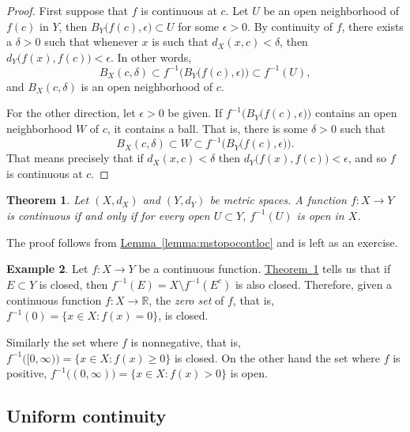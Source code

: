 \documentclass[12pt,openany]{book}
\newcommand{\R}{{\mathbb{R}}}
\newcommand{\myindex}[1]{#1\index{#1}}
\theoremstyle{plain}
\newtheorem{thm}{Theorem}[section]
\theoremstyle{remark}
\theoremstyle{definition}
\theoremstyle{exercise}
\theoremstyle{example}
\newtheorem{example}[thm]{Example}
\newcommand{\thmref}[1]{\hyperref[#1]{Theorem~\ref*{#1}}}
\newcommand{\lemmaref}[1]{\hyperref[#1]{Lemma~\ref*{#1}}}
\begin{document}
\begin{proof}
First suppose that $f$ is continuous at $c$.
Let $U$ be an open neighborhood of $f(c)$
in $Y$, then $B_Y\bigl(f(c),\epsilon\bigr) \subset U$ for some $\epsilon >
0$.  By continuity of $f$, there exists a $\delta > 0$
such that whenever $x$ is such that $d_X(x,c) < \delta$, then
$d_Y\bigl(f(x),f(c)\bigr) < \epsilon$.  In other words,
\begin{equation*}
B_X(c,\delta) \subset f^{-1}\bigl(B_Y\bigl(f(c),\epsilon\bigr)\bigr) \subset
f^{-1}(U) ,
\end{equation*}
and $B_X(c,\delta)$ is an open neighborhood of $c$.

For the other direction,
let $\epsilon > 0$ be given.  If
$f^{-1}\bigl(B_Y\bigl(f(c),\epsilon\bigr)\bigr)$ contains an open
neighborhood $W$ of $c$, it contains a ball.  That is, there is some $\delta > 0$
such that
\begin{equation*}
B_X(c,\delta) \subset W \subset f^{-1}\bigl(B_Y\bigl(f(c),\epsilon\bigr)\bigr) .
\end{equation*}
That means precisely that if $d_X(x,c) < \delta$ then $d_Y\bigl(f(x),f(c)\bigr)
< \epsilon$, and so $f$ is continuous at $c$.
\end{proof}

\begin{thm} \label{thm:mstopocont}
Let $(X,d_X)$ and $(Y,d_Y)$ be metric spaces.  A function $f \colon X \to Y$
is continuous if and only if
for every open $U \subset Y$, $f^{-1}(U)$ is open in $X$.
\end{thm}

The proof follows from \lemmaref{lemma:mstopocontloc} and is left as
an exercise.

\begin{example}
Let $f \colon X \to Y$ be a continuous function.
\thmref{thm:mstopocont} tells us that if $E \subset Y$ is closed, then 
$f^{-1}(E) = X \setminus f^{-1}(E^c)$ is also closed.  Therefore,
given
a continuous
function $f \colon X \to \R$, the
\emph{\myindex{zero set}} of $f$, that is, 
$f^{-1}(0) = \{ x \in X :
f(x) = 0 \}$, is closed.

Similarly the set where $f$ is nonnegative, that is,
$f^{-1}\bigl( [0,\infty) \bigr) = \{ x \in X :
f(x) \geq 0 \}$ is closed.  On the other hand the
set where $f$ is positive,
$f^{-1}\bigl( (0,\infty) \bigr) = \{ x \in X :
f(x) > 0 \}$ is open.  
\end{example}

\subsection{Uniform continuity}
\end{document}
